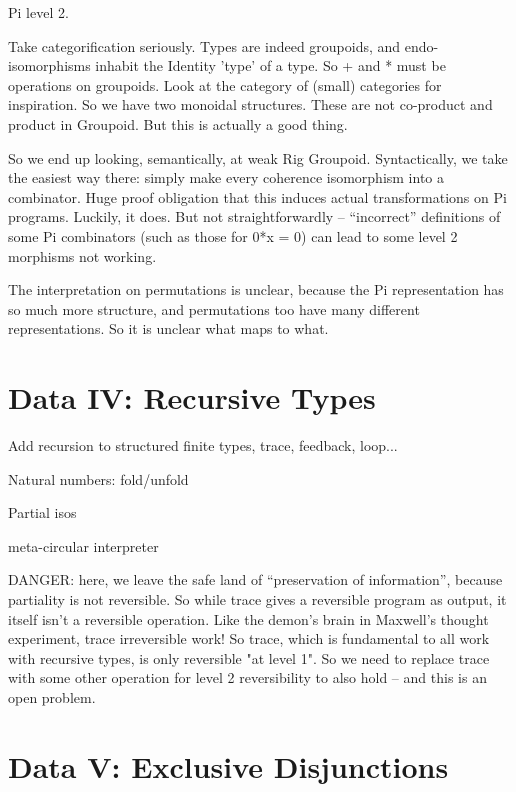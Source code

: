\documentclass{article}
\begin{document}
Pi level 2.

Take categorification seriously. Types are indeed groupoids, and
endo-isomorphisms inhabit the Identity 'type' of a type. So + and *
must be operations on groupoids. Look at the category of (small)
categories for inspiration. So we have two monoidal structures.
These are not co-product and product in Groupoid. But this is actually
a good thing.

So we end up looking, semantically, at weak Rig Groupoid. Syntactically,
we take the easiest way there: simply make every coherence isomorphism into
a combinator. Huge proof obligation that this induces actual transformations
on Pi programs. Luckily, it does.  But not straightforwardly -- ``incorrect''
definitions of some Pi combinators (such as those for 0*x = 0) can lead to
some level 2 morphisms not working. 

The interpretation on permutations is unclear, because the Pi representation
has so much more structure, and permutations too have many different 
representations. So it is unclear what maps to what.

\section{Data IV: Recursive Types}

Add recursion to structured finite types, trace, feedback, loop...

Natural numbers: fold/unfold

Partial isos

meta-circular interpreter
 
DANGER: here, we leave the safe land of ``preservation of information'',
because partiality is not reversible. So while trace gives a reversible
program as output, it itself isn't a reversible operation. Like the
demon's brain in Maxwell's thought experiment, trace irreversible work!
So trace, which is fundamental to all work with recursive types, is
only reversible "at level 1". So we need to replace trace with some other
operation for level 2 reversibility to also hold -- and this is an open
problem.

\section{Data V: Exclusive Disjunctions}
\end{document}
